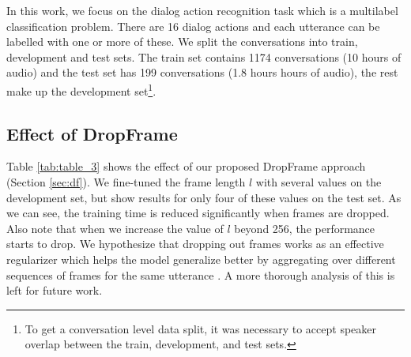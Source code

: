 \documentclass{article}
\begin{document}
In this work, we focus on the dialog action recognition task which is a multilabel classification problem. There are 16 dialog actions and each utterance can be labelled with one or more of these. We split the conversations into train, development and test sets. The train set contains 1174 conversations (10 hours of audio) and the test set has 199 conversations (1.8 hours hours of audio), the rest make up the development set\footnote{To get a conversation level data split, it was necessary to accept speaker overlap between the train, development, and test sets.}.

\subsection{Effect of DropFrame}
\label{subsec:eff_df}
\begin{table}
    \centering
    \caption{Effect of DropFrame. Train time is in minutes/epoch.}
    \label{tab:table_3}
\end{table}

Table \ref{tab:table_3} shows the effect of our proposed DropFrame approach (Section \ref{sec:df}). We fine-tuned the frame length $l$ with several values on the development set, but show results for only four of these values on the test set. As we can see, the training time is reduced significantly when frames are dropped. Also note that when we increase the value of $l$ beyond 256, the performance starts to drop. We hypothesize that dropping out frames works as an effective regularizer which helps the model generalize better by aggregating over different sequences of frames for the same utterance \cite{park2019specaugment, jain2021spliceout}. A more thorough analysis of this is left for future work.
\end{document}
